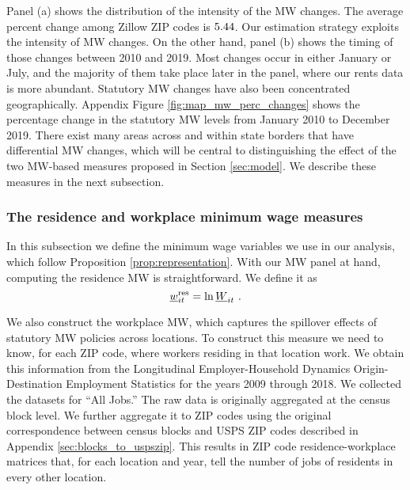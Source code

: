 Panel (a) shows the distribution of the intensity of the MW changes. 
The average percent change among Zillow ZIP codes is $\textnormal{5.44}$.
Our estimation strategy exploits the intensity of MW changes.
On the other hand, panel (b) shows the timing of those changes between 2010 and 
2019.
Most changes occur in either January or July, and the majority of them take 
place later in the panel, where our rents data is more abundant.
Statutory MW changes have also been concentrated geographically.
Appendix Figure \ref{fig:map_mw_perc_changes} shows the percentage change 
in the statutory MW levels from January 2010 to December 2019.
There exist many areas across and within state borders that have differential 
MW changes,
which will be central to distinguishing the effect of the two MW-based measures
proposed in Section \ref{sec:model}.
We describe these measures in the next subsection. 

\subsubsection{The residence and workplace minimum wage measures}

In this subsection we define the minimum wage variables we use in our analysis,
which follow Proposition \ref{prop:representation}.
With our MW panel at hand, computing the residence MW is straightforward.
We define it as
\begin{equation*}
    \underline{w}^{\text{res}}_{it} = \ln \underline{W}_{it} \ .
\end{equation*}

We also construct the workplace MW, which captures the spillover effects of
statutory MW policies across locations.
To construct this measure we need to know, for each ZIP code, where workers 
residing in that location work.
We obtain this information from the Longitudinal Employer-Household 
Dynamics Origin-Destination Employment Statistics \parencite[LODES;][]{CensusLODES}
for the years 2009 through 2018.
We collected the datasets for ``All Jobs.''
The raw data is originally aggregated at the census block level. 
We further aggregate it to ZIP codes using the original correspondence between 
census blocks and USPS ZIP codes described in Appendix 
\ref{sec:blocks_to_uspszip}.
This results in ZIP code residence-workplace matrices that, for each location 
and year, tell the number of jobs of residents in every other location.

